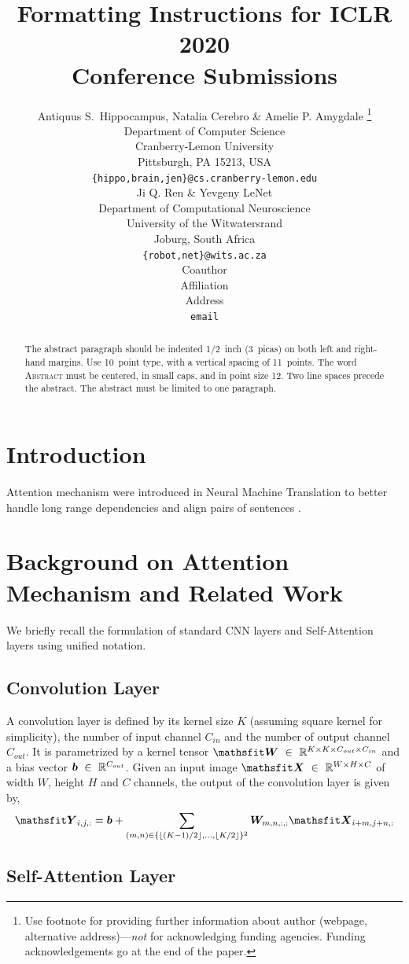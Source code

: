 \documentclass{article} %
\title{Formatting Instructions for ICLR 2020 \\ Conference Submissions}
\author{Antiquus S.~Hippocampus, Natalia Cerebro \& Amelie P. Amygdale \thanks{ Use footnote for providing further information
about author (webpage, alternative address)---\emph{not} for acknowledging
funding agencies.  Funding acknowledgements go at the end of the paper.} \\
Department of Computer Science\\
Cranberry-Lemon University\\
Pittsburgh, PA 15213, USA \\
\texttt{\{hippo,brain,jen\}@cs.cranberry-lemon.edu} \\
\And
Ji Q. Ren \& Yevgeny LeNet \\
Department of Computational Neuroscience \\
University of the Witwatersrand \\
Joburg, South Africa \\
\texttt{\{robot,net\}@wits.ac.za} \\
\AND
Coauthor \\
Affiliation \\
Address \\
\texttt{email}
}
\begin{document}
\maketitle

\begin{abstract}
The abstract paragraph should be indented 1/2~inch (3~picas) on both left and
right-hand margins. Use 10~point type, with a vertical spacing of 11~points.
The word \textsc{Abstract} must be centered, in small caps, and in point size 12. Two
line spaces precede the abstract. The abstract must be limited to one
paragraph.
\end{abstract}

\section{Introduction}

Attention mechanism were introduced in Neural Machine Translation to better handle long range dependencies and align pairs of sentences \citep{Bahdanau2015attention}.

\section{Background on Attention Mechanism and Related Work}

We briefly recall the formulation of standard CNN layers and Self-Attention layers using unified notation.

\subsection{Convolution Layer}

A convolution layer is defined by its kernel size $K$ (assuming square kernel for simplicity), the number of input channel $C_{in}$ and the number of output channel $C_{out}$. 
It is parametrized by a kernel tensor $\tW~\in~\R^{K\times K \times C_{out} \times C_{in}}$ and a bias vector ${\bm{b}}~\in~\mathbb{R}^{C_{out}}$.
Given an input image $\tX~\in~\R^{W\times H \times C}$ of width $W$, height $H$ and $C$ channels, 
the output of the convolution layer is given by,
%
\begin{align}
  \tY_{i,j,:} = 
  \vb 
  +
  \sum_{(m, n) \in \{\lfloor (K-1) / 2 \rfloor, \dots, \lfloor K / 2 \rfloor\}^2}
  \mW_{m,n,:,:}
  \tX_{i+m, j+n, :}
\end{align}
%


\subsection{Self-Attention Layer}
\end{document}
